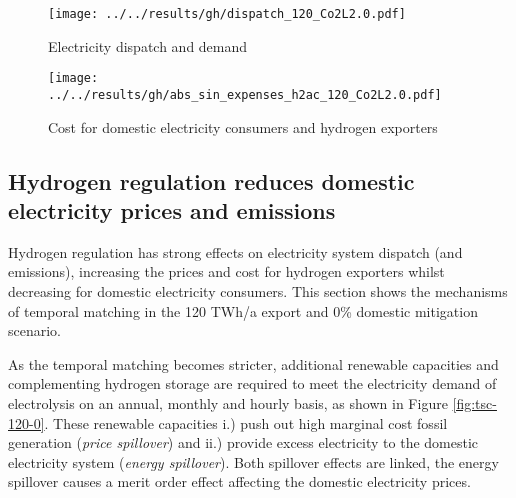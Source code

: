 \begin{figure*}[h!]
    \centering
    \begin{subfigure}[b]{0.49\linewidth}
        \centering
        \texttt{[image: ../../results/gh/dispatch\_120\_Co2L2.0.pdf]}
        \caption{Electricity dispatch and demand}
        \label{fig:dispatch_rule}
    \end{subfigure}
    \hfill
    \begin{subfigure}[b]{0.49\linewidth}
        \centering
        \texttt{[image: ../../results/gh/abs\_sin\_expenses\_h2ac\_120\_Co2L2.0.pdf]}
        \caption{Cost for domestic electricity consumers and hydrogen exporters}
        \label{fig:expense_h2ac}
    \end{subfigure}
    \hfill
    \caption{Electricity dispatch and demand (\ref{fig:dispatch_rule}) and cost for consumers (\ref{fig:expense_h2ac}) for various (hydrogen) temporal matching regimes in the 120 TWh/a export and 0\% mitigation scenario. Stricter temporal matching decreases carbon-intensive electricity generation (coal \& gas) for hydrogen generation and even domestic electricity consumers (s. Fig. \ref{fig:dispatch_rule}). Cost for export hydrogen generation increase to fulfill the temporal matching constraint, whereas domestic electricity consumers profit from stricter hydrogen regulation.}
    \label{fig:expenses_rule}
\end{figure*}


\subsection*{Hydrogen regulation reduces domestic electricity prices and emissions}
\label{subsec:benefits_rule}

Hydrogen regulation has strong effects on electricity system dispatch (and emissions), increasing the prices and cost for hydrogen exporters whilst decreasing for domestic electricity consumers. This section shows the mechanisms of temporal matching in the 120 TWh/a export and 0\% domestic mitigation scenario.

As the temporal matching becomes stricter, additional renewable capacities and complementing hydrogen storage are required to meet the electricity demand of electrolysis on an annual, monthly and hourly basis, as shown in Figure \ref{fig:tsc-120-0}. These renewable capacities i.) push out high marginal cost fossil generation (\textit{price spillover}) and ii.) provide excess electricity to the domestic electricity system (\textit{energy spillover}). Both spillover effects are linked, the energy spillover causes a merit order effect affecting the domestic electricity prices.

